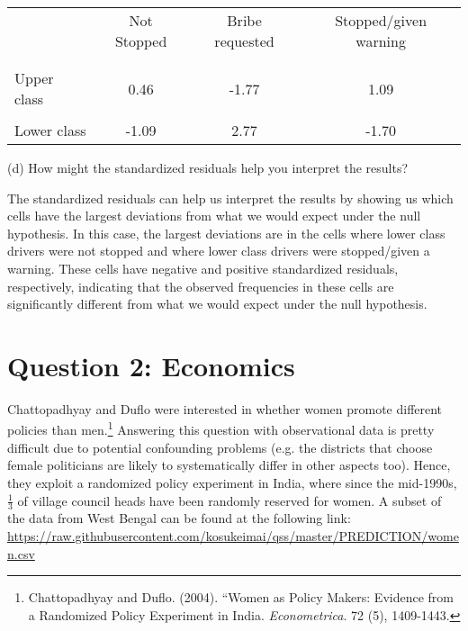 \documentclass[12pt,letterpaper]{article}
\begin{document}
\begin{enumerate}
\begin{table}[h]
	\centering
	\begin{tabular}{l | c c c }
		& Not Stopped & Bribe requested & Stopped/given warning \\
		\\[-1.8ex] 
		\hline \\[-1.8ex]
		Upper class & 0.46 & -1.77 & 1.09 \\
		\\
		Lower class & -1.09 & 2.77 & -1.70 \\
	\end{tabular}
\end{table}
	
	
	\vspace{2cm}
(d) How might the standardized residuals help you interpret the results?  
	
	The standardized residuals can help us interpret the results by showing us which cells have the largest deviations from what we would expect under the null hypothesis. In this case, the largest deviations are in the cells where lower class drivers were not stopped and where lower class drivers were stopped/given a warning. These cells have negative and positive standardized residuals, respectively, indicating that the observed frequencies in these cells are significantly different from what we would expect under the null hypothesis.
	
\newpage

\section*{Question 2: Economics}
Chattopadhyay and Duflo were interested in whether women promote different policies than men.\footnote{Chattopadhyay and Duflo. (2004). ``Women as Policy Makers: Evidence from a Randomized Policy Experiment in India. \textit{Econometrica}. 72 (5), 1409-1443.} Answering this question with observational data is pretty difficult due to potential confounding problems (e.g. the districts that choose female politicians are likely to systematically differ in other aspects too). Hence, they exploit a randomized policy experiment in India, where since the mid-1990s, $\frac{1}{3}$ of village council heads have been randomly reserved for women. A subset of the data from West Bengal can be found at the following link: \url{https://raw.githubusercontent.com/kosukeimai/qss/master/PREDICTION/women.csv}\\


\end{enumerate}
\end{document}
